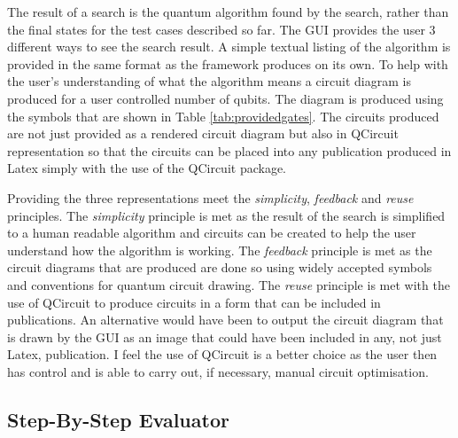 The result of a search is the quantum algorithm found by the search, rather than the final states for the test cases described so far.
The GUI provides the user 3 different ways to see the search result.
A simple textual listing of the algorithm is provided in the same format as the framework produces on its own.
To help with the user's understanding of what the algorithm means a circuit diagram is produced for a user controlled number of qubits.
The diagram is produced using the symbols that are shown in Table \ref{tab:providedgates}.
The circuits produced are not just provided as a rendered circuit diagram but also in QCircuit\cite{QCsite} representation so that the circuits can be placed into any publication produced in Latex simply with the use of the QCircuit package.

Providing the three representations meet the \emph{simplicity}, \emph{feedback} and \emph{reuse} principles.
The \emph{simplicity} principle is met as the result of the search is simplified to a human readable algorithm and circuits can be created to help the user understand how the algorithm is working.
The \emph{feedback} principle is met as the circuit diagrams that are produced are done so using widely accepted symbols and conventions for quantum circuit drawing.
The \emph{reuse} principle is met with the use of QCircuit to produce circuits in a form that can be included in publications.
An alternative would have been to output the circuit diagram that is drawn by the GUI as an image that could have been included in any, not just Latex, publication.
I feel the use of QCircuit is a better choice as the user then has control and is able to carry out, if necessary, manual circuit optimisation.

\subsection{Step-By-Step Evaluator}
\label{sec:sbse}

